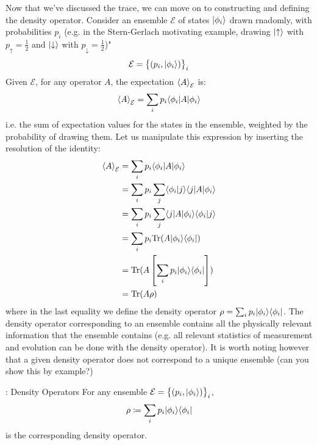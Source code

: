 Now that we've discussed the trace, we can move on to constructing and defining the density operator. Consider an ensemble $\mathcal{E}$ of states $\ket{\phi_i}$ drawn rnadomly, with probabilities $p_i$ (e.g. in the Stern-Gerlach motivating example, drawing $\lvert \uparrow \rangle$ with $p_\uparrow = \frac{1}{2}$ and $\lvert \downarrow \rangle$ with $p_\downarrow = \frac{1}{2}$)"
\begin{equation}
    \mathcal{E} = \set{(p_i, \ket{\phi_i})}_i
\end{equation}
Given $\mathcal{E}$, for any operator $A$, the expectation $\left< A \right>_\mathcal{E}$ is:
\begin{equation}
    \avg{A}_\mathcal{E} = \sum_i p_i \bra{\phi_i}A\ket{\phi_i}
\end{equation}
i.e. the sum of expectation values for the states in the ensemble, weighted by the probability of drawing them. Let us manipulate this expression by inserting the resolution of the identity:
\begin{equation}
    \begin{split}
        \avg{A}_\mathcal{E} &= \sum_i p_i \bra{\phi_i}A\ket{\phi_i}
        \\ &= \sum_i p_i \sum_j \braket{\phi_i}{j}\bra{j}A\ket{\phi_i}
        \\ &= \sum_i p_i \sum_j \bra{j}A\ket{\phi_i}\braket{\phi_i}{j}
        \\ &= \sum_i p_i \Tr(A\dyad{\phi_i}{\phi_i})
        \\ &= \Tr(A\left[\sum_i p_i \dyad{\phi_i}{\phi_i}\right])
        \\ &= \Tr(A\rho)
    \end{split}
\end{equation}
where in the last equality we define the density operator $\rho = \sum_i p_i \dyad{\phi_i}{\phi_i}$. The density operator corresponding to an ensemble contains all the physically relevant information that the ensemble contains (e.g. all relevant statistics of measurement and evolution can be done with the density operator). It is worth noting however that a given density operator does not correspond to a unique ensemble (can you show this by example?)

\begin{defbox}{: Density Operators}
    For any ensemble $\mathcal{E} = \set{(p_i, \ket{\phi_i})}_i$,
    \begin{equation}
        \rho \coloneqq \sum_i p_i \dyad{\phi_i}{\phi_i}
    \end{equation}
    is the corresponding density operator.
\end{defbox}

